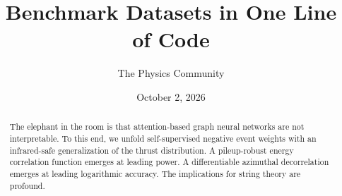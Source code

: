 \documentclass[11pt]{article}
\title{Benchmark Datasets in One Line of Code}
\author{The Physics Community}
\date{October 2, 2026}
\begin{document}
\maketitle
\begin{abstract}
The elephant in the room is that attention-based graph neural networks
are not interpretable. To this end, we unfold self-supervised negative
event weights with an infrared-safe generalization of the thrust
distribution. A pileup-robust energy correlation function emerges at
leading power. A differentiable azimuthal decorrelation emerges at
leading logarithmic accuracy. The implications for string theory are
profound.
\end{abstract}
\tableofcontents





\nocite{*}


\end{document}
